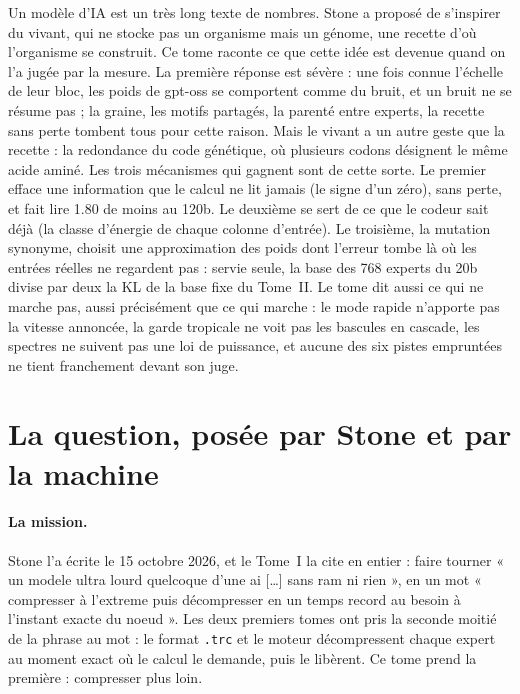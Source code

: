 \begin{enbref}
Un modèle d'IA est un très long texte de nombres. Stone a proposé de s'inspirer du vivant, qui ne stocke pas un organisme mais un génome, une recette d'où l'organisme se construit. Ce tome raconte ce que cette idée est devenue quand on l'a jugée par la mesure. La première réponse est sévère : une fois connue l'échelle de leur bloc, les poids de gpt-oss se comportent comme du bruit, et un bruit ne se résume pas ; la graine, les motifs partagés, la parenté entre experts, la recette sans perte tombent tous pour cette raison. Mais le vivant a un autre geste que la recette : la redondance du code génétique, où plusieurs codons désignent le même acide aminé. Les trois mécanismes qui gagnent sont de cette sorte. Le premier efface une information que le calcul ne lit jamais (le signe d'un zéro), sans perte, et fait lire \SI{1.80}{\Go} de moins au 120b. Le deuxième se sert de ce que le codeur sait déjà (la classe d'énergie de chaque colonne d'entrée). Le troisième, la mutation synonyme, choisit une approximation des poids dont l'erreur tombe là où les entrées réelles ne regardent pas : servie seule, la base des 768 experts du 20b divise par deux la KL de la base fixe du Tome~II. Le tome dit aussi ce qui ne marche pas, aussi précisément que ce qui marche : le mode rapide n'apporte pas la vitesse annoncée, la garde tropicale ne voit pas les bascules en cascade, les spectres ne suivent pas une loi de puissance, et aucune des six pistes empruntées ne tient franchement devant son juge.
\end{enbref}

\section{La question, posée par Stone et par la machine}\label{t3int:sec:question}

\paragraph{La mission.} Stone l'a écrite le 15 octobre 2026, et le Tome~I la cite en entier : faire tourner « un modele ultra lourd quelcoque d'une ai […] sans ram ni rien », en un mot « compresser à l'extreme puis décompresser en un temps record au besoin à l'instant exacte du noeud ». Les deux premiers tomes ont pris la seconde moitié de la phrase au mot : le format \texttt{.trc} et le moteur décompressent chaque expert au moment exact où le calcul le demande, puis le libèrent. Ce tome prend la première : compresser plus loin.


